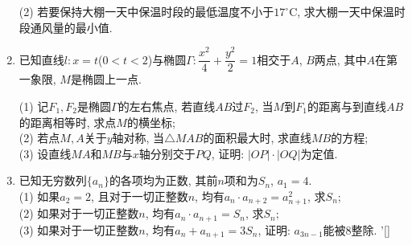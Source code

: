 \documentclass[10pt,a4paper]{article}
\begin{document}
\begin{enumerate}[1.]
(2) 若要保持大棚一天中保温时段的最低温度不小于$17^\circ\text{C}$, 求大棚一天中保温时段通风量的最小值.
\item 已知直线$l:x=t$($0<t<2$)与椭圆$\Gamma:\dfrac{x^2}4+\dfrac{y^2}2=1$相交于$A$, $B$两点, 其中$A$在第一象限, $M$是椭圆上一点.
\begin{center}
\end{center}
(1) 记$F_1,F_2$是椭圆$\Gamma$的左右焦点, 若直线$AB$过$F_2$, 当$M$到$F_1$的距离与到直线$AB$的距离相等时, 求点$M$的横坐标;\\
(2) 若点$M,A$关于$y$轴对称, 当$\triangle MAB$的面积最大时, 求直线$MB$的方程;\\
(3) 设直线$MA$和$MB$与$x$轴分别交于$PQ$, 证明: $|OP|\cdot |OQ|$为定值.
\item 已知无穷数列$\{a_n\}$的各项均为正数, 其前$n$项和为$S_n$, $a_1=4$.\\
(1) 如果$a_2=2$, 且对于一切正整数$n$, 均有$a_n\cdot a_{n+2}=a_{n+1}^2$, 求$S_n$;\\
(2) 如果对于一切正整数$n$, 均有$a_n\cdot a_{n+1}=S_n$, 求$S_n$;\\
(3) 如果对于一切正整数$n$, 均有$a_n+a_{n+1}=3S_n$, 证明: $a_{3n-1}$能被$8$整除.
'[]








\end{enumerate}
\end{document}
